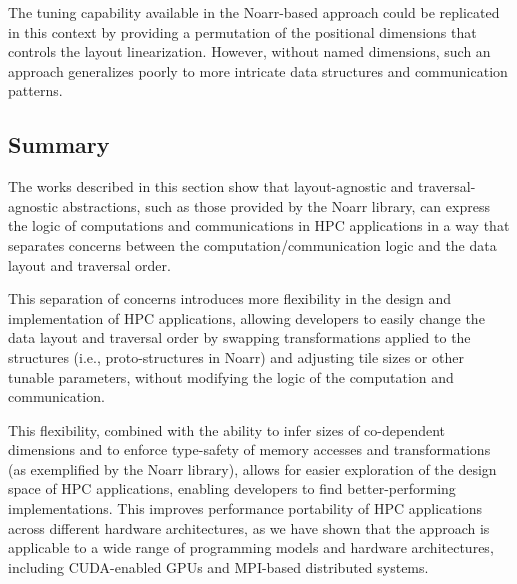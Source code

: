 The tuning capability available in the Noarr-based approach could be replicated in this context by providing a permutation of the positional dimensions that controls the layout linearization. However, without named dimensions, such an approach generalizes poorly to more intricate data structures and communication patterns.


\subsection{Summary}\label{sec:noarr-summary}


The works described in this section show that layout-agnostic and traversal-agnostic abstractions, such as those provided by the Noarr library, can express the logic of computations and communications in HPC applications in a way that separates concerns between the computation/communication logic and the data layout and traversal order.

This separation of concerns introduces more flexibility in the design and implementation of HPC applications, allowing developers to easily change the data layout and traversal order by swapping transformations applied to the structures (i.e., proto-structures in Noarr) and adjusting tile sizes or other tunable parameters, without modifying the logic of the computation and communication.

This flexibility, combined with the ability to infer sizes of co-dependent dimensions and to enforce type-safety of memory accesses and transformations (as exemplified by the Noarr library), allows for easier exploration of the design space of HPC applications, enabling developers to find better-performing implementations. This improves performance portability of HPC applications across different hardware architectures, as we have shown that the approach is applicable to a wide range of programming models and hardware architectures, including CUDA-enabled GPUs and MPI-based distributed systems.
